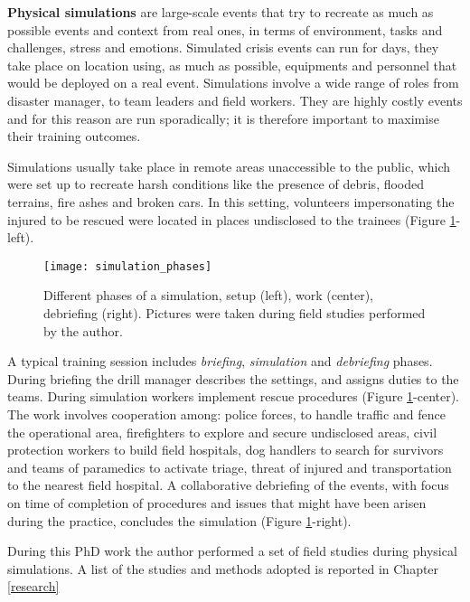 \textbf{Physical simulations} are large-scale events that try to
recreate as much as possible events and context from real ones, in terms
of environment, tasks and challenges, stress and emotions. Simulated
crisis events can run for days, they take place on location using, as
much as possible, equipments and personnel that would be deployed on a
real event. Simulations involve a wide range of roles from disaster
manager, to team leaders and field workers. They are highly costly
events and for this reason are run sporadically; it is therefore
important to maximise their training outcomes.

Simulations usually take place in remote areas unaccessible to the
public, which were set up to recreate harsh conditions like the presence
of debris, flooded terrains, fire ashes and broken cars. In this
setting, volunteers impersonating the injured to be rescued were located
in places undisclosed to the trainees (Figure
\ref{fig:simulation-phases}-left).

\begin{figure}[tbh]
    \centering
    \texttt{[image: simulation\_phases]}
    \caption{Different phases of a simulation, setup (left), work (center), debriefing (right). Pictures were taken during field studies performed by the author.}
    \label{fig:simulation-phases}
\end{figure}

A typical training session includes \emph{briefing}, \emph{simulation}
and \emph{debriefing} phases. During briefing the drill manager
describes the settings, and assigns duties to the teams. During
simulation workers implement rescue procedures (Figure
\ref{fig:simulation-phases}-center). The work involves cooperation
among: police forces, to handle traffic and fence the operational area,
firefighters to explore and secure undisclosed areas, civil protection
workers to build field hospitals, dog handlers to search for survivors
and teams of paramedics to activate triage, threat of injured and
transportation to the nearest field hospital. A collaborative debriefing
of the events, with focus on time of completion of procedures and issues
that might have been arisen during the practice, concludes the
simulation (Figure \ref{fig:simulation-phases}-right).

During this PhD work the author performed a set of field studies during
physical simulations. A list of the studies and methods adopted is
reported in Chapter \ref{research}

